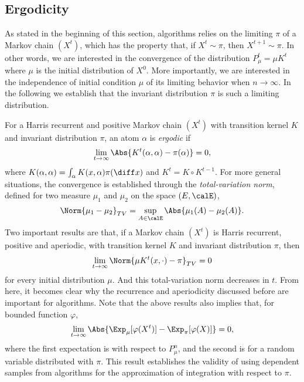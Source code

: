 \subsection{Ergodicity}
\label{sub: Appdendix Ergodicity}

As stated in the beginning of this section, \mcmc algorithms relies on the limiting $\pi$ of a Markov chain $(X^t)$, which has the property that, if $X^t\sim\pi$, then $X^{t+1}\sim\pi$. In other words, we are interested in the convergence of the distribution $P_{\mu}^t = \mu K^t$ where $\mu$ is the initial distribution of $X^0$. More importantly, we are interested in the independence of initial condition $\mu$ of its limiting behavior when $n\to\infty$. In the following we establish that the invariant distribution $\pi$ is such a limiting distribution.

For a Harris recurrent and positive Markov chain $(X^t)$ with transition kernel $K$ and invariant distribution $\pi$, an atom $\alpha$ is \emph{ergodic} if
\begin{equation}
  \lim_{t\to\infty}\Abs{K^t(\alpha,\alpha) - \pi(\alpha)} = 0,
\end{equation}
where $K(\alpha,\alpha) = \int_{\alpha}K(x,\alpha)\pi(\diff x)$ and $K^t = K\vysmwhtcircle K^{t-1}$. For more general situations, the convergence is established through the \emph{total-variation norm}, defined for two measure $\mu_1$ and $\mu_2$ on the space $(E,\calE)$,
\begin{equation}
  \Norm{\mu_1-\mu_2}_{TV} = \sup_{A\in\calE}\Abs{\mu_1(A) - \mu_2(A)}.
\end{equation}
Two important results are that, if a Markov chain $(X^t)$ is Harris recurrent, positive and aperiodic, with transition kernel $K$ and invariant distribution $\pi$, then
\begin{equation}
  \lim_{t\to\infty}\Norm{\mu K^t(x,\cdot) - \pi}_{TV} = 0
\end{equation}
for every initial distribution $\mu$. And this total-variation norm decreases in $t$. From here, it becomes clear why the recurrence and aperiodicity discussed before are important for \mcmc algorithms. Note that the above results also implies that, for bounded function $\varphi$,
\begin{equation}
  \lim_{t\to\infty}\Abs{\Exp_{\mu}[\varphi(X^t)] - \Exp_{\pi}[\varphi(X)]}
  = 0,
\end{equation}
where the first expectation is with respect to $P_{\mu}^n$, and the second is for a random variable distributed with $\pi$. This result establishes the validity of using dependent samples from \mcmc algorithms for the approximation of integration with respect to $\pi$.

